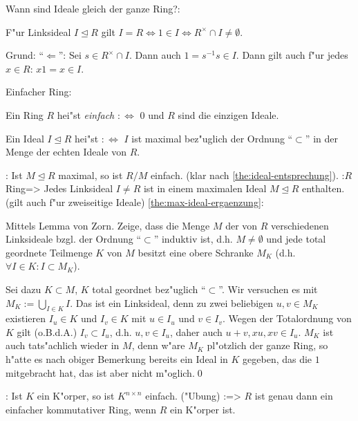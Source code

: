 \remark Wann sind Ideale gleich der ganze Ring?:{
  F"ur Linksideal $I\unlhd R$ gilt $I=R\iff 1\in I\iff R^\times\cap I\neq \emptyset$.
  
  Grund: ``$\Leftarrow$'': Sei $s\in R^\times\cap I$. Dann auch $1=s^{-1}s\in I$. Dann gilt
  auch f"ur jedes $x\in R$: $x1=x\in I$.
  }
 Einfacher Ring:{
  Ein Ring $R$ hei"st \emph{einfach} $:\iff$ $0$ und $R$ sind die einzigen
  Ideale.
  
  Ein Ideal $I\unlhd R$ hei"st \emph{} $:\iff$
  $I$ ist maximal bez"uglich der Ordnung ``$\subset$'' in der Menge der echten Ideale
  von $R$.
  }
\remark:{
  Ist $M\unlhd R$ maximal, so ist $R/M$ einfach. (klar nach \ref{the:ideal-entsprechung}).
  }
\lemma:$R$ Ring=>{
  \label{the:max-ideal-ergaenzung}
  Jedes Linksideal $I\neq R$ ist in einem maximalen Ideal $M\unlhd R$
  enthalten. (gilt auch f"ur zweiseitige Ideale)
  }
\proof \ref{the:max-ideal-ergaenzung}:{
  Mittels Lemma von Zorn. Zeige, dass die Menge $M$ der von $R$ verschiedenen
  Linksideale bzgl. der Ordnung ``$\subset$'' induktiv ist, d.h. $M\neq\emptyset$ und
  jede total geordnete Teilmenge $K$ von $M$ besitzt eine obere Schranke
  $M_K$ (d.h. $\forall I\in K:I\subset M_K$).
  
  Sei dazu $K\subset M$, $K$ total geordnet bez"uglich ``$\subset$''. Wir versuchen es
  mit $M_K:=\bigcup_{I\in K} I$. Das ist ein Linksideal, denn zu zwei beliebigen
  $u,v\in M_K$ existieren $I_u\in K$ und $I_v\in K$ mit $u\in I_u$ und $v\in I_v$. Wegen der
  Totalordnung von $K$ gilt (o.B.d.A.) $I_v\subset I_u$, d.h. $u,v\in I_u$, daher
  auch $u+v,xu,xv\in I_u$. $M_K$ ist auch tats"achlich wieder in $M$, denn
  w"are $M_K$ pl"otzlich der ganze Ring, so h"atte es nach obiger 
  Bemerkung bereits ein Ideal in $K$ gegeben, das die $1$ mitgebracht hat,
  das ist aber nicht m"oglich.\qed
  }
\example:{
  Ist $K$ ein K"orper, so ist $K^{n\times n}$ einfach. ("Ubung)
  }
\theorem:=>{
  \label{the:einfach-kommutativ-ist-koerper}
  $R$ ist genau dann ein einfacher kommutativer Ring, wenn $R$ ein K"orper ist.
  }
